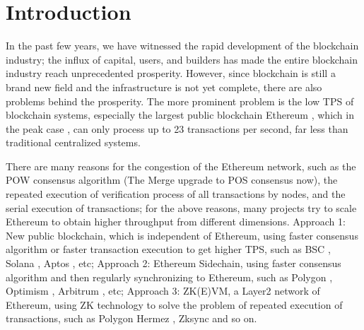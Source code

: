\section{Introduction}\label{sec:introduction}

In the past few years, we have witnessed the rapid development of the blockchain industry; the influx of capital, users, and builders has made the entire blockchain industry reach unprecedented prosperity. However, since blockchain is still a brand new field and the infrastructure is not yet complete, there are also problems behind the prosperity. The more prominent problem is the low TPS of blockchain systems, especially the largest public blockchain Ethereum \cite{website:Ethereum}, which in the peak case \cite{website:Etherscan-chart}, can only process up to 23 transactions per second, far less than traditional centralized systems. 

There are many reasons for the congestion of the Ethereum network, such as the POW \cite{website:POW} consensus algorithm (The Merge upgrade \cite{website:The-Merge} to POS \cite{website:POS} consensus now), the repeated execution of verification process of all transactions by nodes, and the serial execution of transactions; for the above reasons, many projects try to scale Ethereum to obtain higher throughput from different dimensions. Approach 1: New public blockchain, which is independent of Ethereum, using faster consensus algorithm or faster transaction execution to get higher TPS, such as BSC \cite{website:BSC}, Solana \cite{website:Solana}, Aptos \cite{website:Aptos}, etc; Approach 2: Ethereum Sidechain, using faster consensus algorithm and then regularly synchronizing to Ethereum, such as Polygon \cite{website:Polygon}, Optimism \cite{website:Optimism}, Arbitrum \cite{website:Arbitrum}, etc; Approach 3: ZK(E)VM, a Layer2 network of Ethereum, using ZK technology to solve the problem of repeated execution of transactions, such as Polygon Hermez \cite{website:Polygon-Hermez}, Zksync \cite{website:Zksync} and so on.

